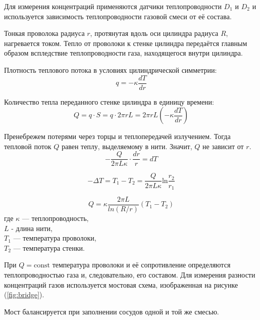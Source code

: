 \documentclass[a4paper,12pt]{article} %
\begin{document}
\medskip

Для измерения концентраций применяются датчики теплопроводности $D_1$ и $D_2$ и используется зависимость теплопроводности газовой смеси от её состава. 

Тонкая проволока радиуса $r$, протянутая вдоль оси цилиндра радиуса $R$, нагревается током. Тепло от проволоки к стенке цилиндра передаётся главным образом вспледствие теплопроводности газа, находящегося внутри цилиндра. 

Плотность теплового потока в условиях цилиндрической симметрии:
\begin{equation}
  q = - \kappa \frac{d T}{d r}
\end{equation}

Количество тепла переданного стенке цилиндра в единицу времени:
\begin{equation}
  Q = q \cdot S = q \cdot 2 \pi r L = 2 \pi r L (- \kappa \frac{d T}{d r})
\end{equation}

Пренебрежем потерями через торцы и теплопередачей излучением. Тогда тепловой поток $Q$ равен теплу, выделяемому в нити. Значит, $Q$ не зависит от $r$.
\begin{equation}
  - \frac{Q}{2 \pi L \kappa} \cdot \frac{d r}{r} = d T
\end{equation}

\begin{equation}
  - \Delta T = T_1 - T_2 = \frac{Q}{2 \pi L \kappa} \text{ln} \frac{r_2}{r_1}
\end{equation}

\begin{equation}
Q = \kappa \frac{2\pi L}{ln (R/r)}(T_1-T_2)
\end{equation}
где $\kappa$ — теплопроводность, \\
$L$ - длина нити, \\
$T_1$ — температура проволоки, \\
$T_2$ — температура стенки. 

При $Q = \text{const}$ температура проволоки и её сопротивление определяются теплопроводностью газа и, следовательно, его составом. Для измерения разности концентраций газов используется мостовая схема, изображенная на рисунке (\ref{fig:bridge}).

Мост балансируется при заполнении сосудов одной и той же смесью.
\end{document}
